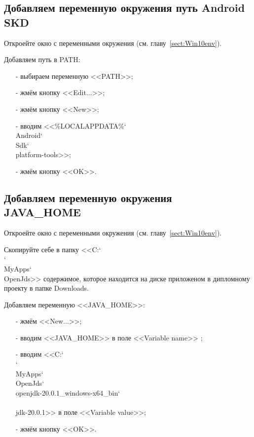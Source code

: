 \subsection{Добавляем переменную окружения путь Android SKD}

Откроейте окно с переменными окружения (см. главу~\ref{sect:Win10env}).

Добавляем путь в PATH:
\begin{itemize}
    \item[-] выбираем переменную <<PATH>>;
    \item[-] жмём кнопку <<Edit...>>;
    \item[-] жмём кнопку <<New>>;
    \item[-] вводим <<\%LOCALAPPDATA\%{\char`\\}Android{\char`\\}Sdk{\char`\\}platform-tools>>;
    \item[-] жмём кнопку <<OK>>.
\end{itemize}

\subsection{Добавляем переменную окружения JAVA\_HOME}

Откроейте окно с переменными окружения (см. главу~\ref{sect:Win10env}).

Скопируйте себе в папку <<C:{\char`\\}{\char`\\}MyApps{\char`\\}OpenJds>> содержимое, которое находится
на диске приложеном в дипломному проекту в папке Downloads.

Добавляем переменную <<JAVA\_HOME>>:
\begin{itemize}
    \item[-] жмём <<New...>>;
    \item[-] вводим <<JAVA\_HOME>> в поле <<Variable name>> ;
    \item[-] вводим <<C:{\char`\\}{\char`\\}MyApps{\char`\\}OpenJds{\char`\\}openjdk-20.0.1\_windows-x64\_bin{\char`\\}\\jdk-20.0.1>>
    в поле <<Variable value>>;
    \item[-] жмём кнопку <<OK>>.
\end{itemize}

